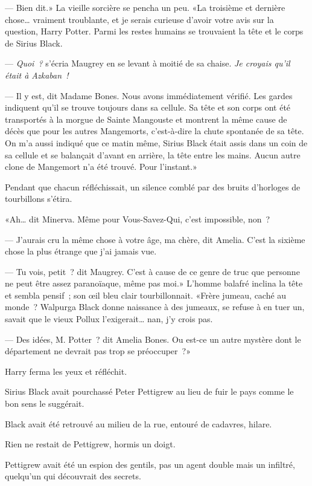 --- Bien dit.» La vieille sorcière se pencha un peu. «La troisième et dernière chose… vraiment troublante, et je serais curieuse d'avoir votre avis sur la question, Harry Potter. Parmi les restes humains se trouvaient la tête et le corps de Sirius Black.

--- \emph{Quoi~?} s'écria Maugrey en se levant à moitié de sa chaise. \emph{Je croyais qu'il était à Azkaban~!}

--- Il y est, dit Madame Bones. Nous avons immédiatement vérifié. Les gardes indiquent qu'il se trouve toujours dans sa cellule. Sa tête et son corps ont été transportés à la morgue de Sainte Mangouste et montrent la même cause de décès que pour les autres Mangemorts, c'est-à-dire la chute spontanée de sa tête. On m'a aussi indiqué que ce matin même, Sirius Black était assis dans un coin de sa cellule et se balançait d'avant en arrière, la tête entre les mains. Aucun autre clone de Mangemort n'a été trouvé. Pour l'instant.»

Pendant que chacun réfléchissait, un silence comblé par des bruits d'horloges de tourbillons s'étira.

«Ah… dit Minerva. Même pour Vous-Savez-Qui, c'est impossible, non~?

--- J'aurais cru la même chose à votre âge, ma chère, dit Amelia. C'est la sixième chose la plus étrange que j'ai jamais vue.

--- Tu vois, petit~? dit Maugrey. C'est à cause de ce genre de truc que personne ne peut être assez paranoïaque, même pas moi.» L'homme balafré inclina la tête et sembla pensif~; son œil bleu clair tourbillonnait. «Frère jumeau, caché au monde~? Walpurga Black donne naissance à des jumeaux, se refuse à en tuer un, savait que le vieux Pollux l'exigerait… nan, j'y crois pas.

--- Des idées, M. Potter~? dit Amelia Bones. Ou est-ce un autre mystère dont le département ne devrait pas trop se préoccuper~?»

Harry ferma les yeux et réfléchit.

Sirius Black avait pourchassé Peter Pettigrew au lieu de fuir le pays comme le bon sens le suggérait.

Black avait été retrouvé au milieu de la rue, entouré de cadavres, hilare.

Rien ne restait de Pettigrew, hormis un doigt.

Pettigrew avait été un espion des gentils, pas un agent double mais un infiltré, quelqu'un qui découvrait des secrets.

